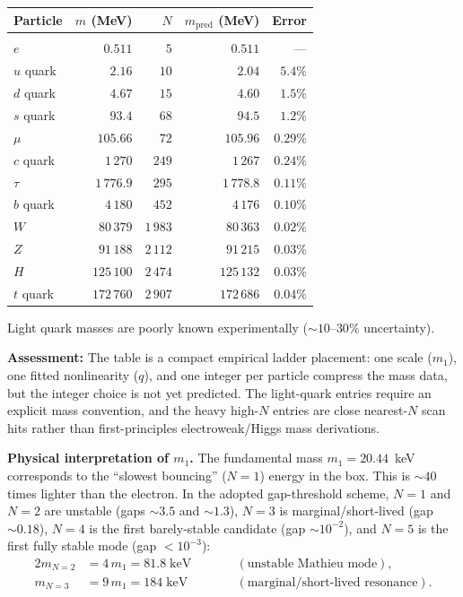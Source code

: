 \documentclass[11pt]{article}
\begin{document}
\begin{center}
\renewcommand{\arraystretch}{1.3}
\begin{tabular}{@{}lrrrr@{}}
\textbf{Particle}
  & \textbf{$m$ (MeV)}
  & \textbf{$N$}
  & \textbf{$m_{\mathrm{pred}}$ (MeV)}
  & \textbf{Error} \\[2pt]
\hline\\[-6pt]
$e$ & $0.511$ & $5$ & $0.511$ & --- \\
$u$ quark & $2.16$ & $10$ & $2.04$ & $5.4\%$\rlap{$^*$} \\
$d$ quark & $4.67$ & $15$ & $4.60$ & $1.5\%$\rlap{$^*$} \\
$s$ quark & $93.4$ & $68$ & $94.5$ & $1.2\%$\rlap{$^*$} \\
$\mu$ & $105.66$ & $72$ & $105.96$ & $0.29\%$ \\
$c$ quark & $1\,270$ & $249$ & $1\,267$ & $0.24\%$ \\
$\tau$ & $1\,776.9$ & $295$ & $1\,778.8$ & $0.11\%$ \\
$b$ quark & $4\,180$ & $452$ & $4\,176$ & $0.10\%$ \\
$W$ & $80\,379$ & $1\,983$ & $80\,363$ & $0.02\%$ \\
$Z$ & $91\,188$ & $2\,112$ & $91\,215$ & $0.03\%$ \\
$H$ & $125\,100$ & $2\,474$ & $125\,132$ & $0.03\%$ \\
$t$ quark & $172\,760$ & $2\,907$ & $172\,686$ & $0.04\%$ \\
\end{tabular}
\end{center}
\rlap{$^*$}\;Light quark masses are poorly known
experimentally ($\sim 10$--$30\%$ uncertainty).

\medskip
\textbf{Assessment:} The table is a compact empirical
ladder placement: one scale ($m_1$), one fitted
nonlinearity ($q$), and one integer per particle compress
the mass data, but the integer choice is not yet predicted.
The light-quark entries require an explicit mass convention,
and the heavy high-$N$ entries are close nearest-$N$ scan
hits rather than first-principles electroweak/Higgs mass
derivations.

\medskip
\textbf{Physical interpretation of $m_1$.}
The fundamental mass $m_1 = 20.44$~keV corresponds to the
``slowest bouncing'' ($N = 1$) energy in the box.
This is $\sim 40$ times lighter than the electron.
In the adopted gap-threshold scheme, $N=1$ and $N=2$ are
unstable (gaps $\sim3.5$ and $\sim1.3$), $N=3$ is
marginal/short-lived (gap $\sim0.18$), $N=4$ is the first
barely-stable candidate (gap $\sim10^{-2}$), and $N=5$ is
the first fully stable mode (gap $<10^{-3}$):
\begin{alignat}{2}
  m_{N=2} &= 4\,m_1 = 81.8\;\text{keV}
  &\qquad& (\text{unstable Mathieu mode}),\\
  m_{N=3} &= 9\,m_1 = 184\;\text{keV}
  && (\text{marginal/short-lived resonance}).
\end{alignat}
\end{document}
